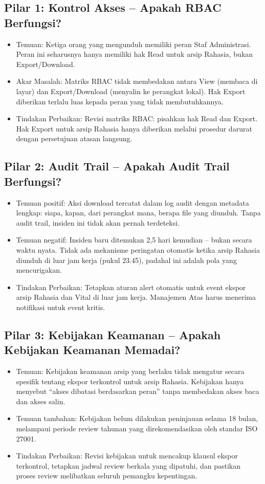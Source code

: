 \documentclass[12pt,a4paper]{report}
\begin{document}
\subsection{Pilar 1: Kontrol Akses -- Apakah RBAC Berfungsi?}
\begin{itemize}[leftmargin=*]
    \item Temuan: Ketiga orang yang mengunduh memiliki peran Staf Administrasi. Peran ini seharusnya hanya memiliki hak Read untuk arsip Rahasia, bukan Export/Download.
    \item Akar Masalah: Matriks RBAC tidak membedakan antara View (membaca di layar) dan Export/Download (menyalin ke perangkat lokal). Hak Export diberikan terlalu luas kepada peran yang tidak membutuhkannya.
    \item Tindakan Perbaikan: Revisi matriks RBAC: pisahkan hak Read dan Export. Hak Export untuk arsip Rahasia hanya diberikan melalui prosedur darurat dengan persetujuan atasan langsung.
\end{itemize}

\subsection{Pilar 2: Audit Trail -- Apakah Audit Trail Berfungsi?}
\begin{itemize}[leftmargin=*]
    \item Temuan positif: Aksi download tercatat dalam log audit dengan metadata lengkap: siapa, kapan, dari perangkat mana, berapa file yang diunduh. Tanpa audit trail, insiden ini tidak akan pernah terdeteksi.
    \item Temuan negatif: Insiden baru ditemukan 2,5 hari kemudian -- bukan secara waktu nyata. Tidak ada mekanisme peringatan otomatis ketika arsip Rahasia diunduh di luar jam kerja (pukul 23.45), padahal ini adalah pola yang mencurigakan.
    \item Tindakan Perbaikan: Tetapkan aturan alert otomatis untuk event ekspor arsip Rahasia dan Vital di luar jam kerja. Manajemen Atas harus menerima notifikasi untuk event kritis.
\end{itemize}

\subsection{Pilar 3: Kebijakan Keamanan -- Apakah Kebijakan Keamanan Memadai?}
\begin{itemize}[leftmargin=*]
    \item Temuan: Kebijakan keamanan arsip yang berlaku tidak mengatur secara spesifik tentang ekspor terkontrol untuk arsip Rahasia. Kebijakan hanya menyebut ``akses dibatasi berdasarkan peran'' tanpa membedakan akses baca dan akses salin.
    \item Temuan tambahan: Kebijakan belum dilakukan peninjauan selama 18 bulan, melampaui periode review tahunan yang direkomendasikan oleh standar ISO 27001.
    \item Tindakan Perbaikan: Revisi kebijakan untuk mencakup klausul ekspor terkontrol, tetapkan jadwal review berkala yang dipatuhi, dan pastikan proses review melibatkan seluruh pemangku kepentingan.
\end{itemize}
\end{document}
